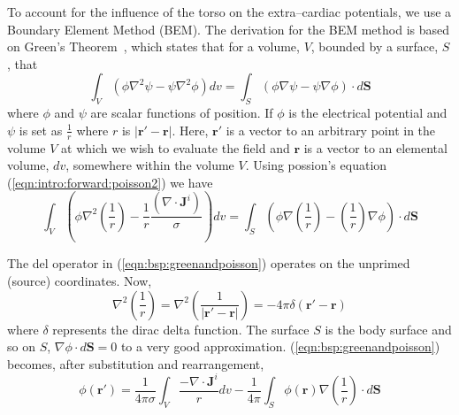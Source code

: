To account for the influence of the torso on the extra--cardiac potentials, we
use a Boundary Element Method (BEM).
The derivation for the BEM method is based on Green's
Theorem~\cite{Barr1966,Gulrajani1989,Clayton2002},
which states that for a volume, $V$, bounded by a surface, $S$, that
\begin{equation}
\label{eqn:bsp:green}
\int_{V} \left(\phi \nabla^{2}\psi - \psi \nabla^{2}\phi  \right) dv =
\int_{S} \left( \phi \nabla \psi - \psi \nabla \phi \right) \cdot d\mathbf{S}
\end{equation}
where $\phi$ and $\psi$ are scalar functions of position.
If $\phi$ is the electrical potential and $\psi$ is set as $\frac{1}{r}$ where
$r$ is $|\mathbf{r'}-\mathbf{r}|$.
Here, $\mathbf{r'}$ is a vector to an arbitrary point in the volume $V$ at which
we wish to evaluate the field and $\mathbf{r}$ is a vector to an elemental
volume, $dv$, somewhere within the volume $V$.
Using possion's equation (\ref{eqn:intro:forward:poisson2}) we have
\begin{equation}
\label{eqn:bsp:greenandpoisson}
\int_{V}
    \left(
        \phi \nabla^{2}\left(\frac{1}{r}\right) -
        \frac{1}{r} \frac{\left(\nabla \cdot \mathbf{J}^{i} \right)}{\sigma}
    \right)
dv =
\int_{S}
    \left(
        \phi \nabla \left(\frac{1}{r}\right) -
        \left(\frac{1}{r}\right) \nabla \phi
    \right)
\cdot d\mathbf{S}
\end{equation}

The del operator in (\ref{eqn:bsp:greenandpoisson}) operates on the unprimed (source) coordinates.
Now,
\begin{equation}
\label{eqn:bsp:oneoverr}
\nabla^{2}\left(\frac{1}{r}\right) =
\nabla^{2}\left(\frac{1}{|\mathbf{r'}-\mathbf{r}|}\right) =
-4\pi\delta\left(\mathbf{r'}-\mathbf{r}\right)
\end{equation}
where $\delta$ represents the dirac delta function.  The surface $S$ is the body
surface and so on $S$, $\nabla\phi \cdot d\mathbf{S} = 0$ to a very good
approximation.  (\ref{eqn:bsp:greenandpoisson}) becomes, after substitution and
rearrangement,
\begin{equation}
\label{eqn:bsp:substituted}
\phi\left(\mathbf{r'}\right) =
\frac{1}{4 \pi \sigma}\int_{V} \frac{-\nabla \cdot \mathbf{J}^{i}}{r}dv - 
\frac{1}{4 \pi}\int_{S} \phi\left(\mathbf{r}\right)
\nabla\left(\frac{1}{r}\right) \cdot d\mathbf{S}
\end{equation}

